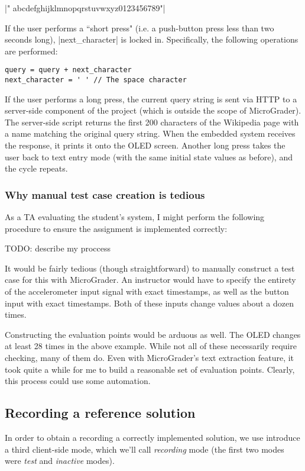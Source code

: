 \documentclass[12pt]{article}
\begin{document}
|" abcdefghijklmnopqrstuvwxyz0123456789"|

If the user performs a ``short press" (i.e. a push-button press less than two seconds long), |next_character| is locked in.  Specifically, the following operations are performed:

\begin{lstlisting}
query = query + next_character
next_character = ' ' // The space character
\end{lstlisting}


If the user performs a long press, the current query string is sent via HTTP to a server-side component of the project (which is outside the scope of MicroGrader).  The server-side script returns the first 200 characters of the Wikipedia page with a name matching the original query string.  When the embedded system receives the response, it prints it onto the OLED screen.  Another long press takes the user back to text entry mode (with the same initial state values as before), and the cycle repeats.

\subsubsection{Why manual test case creation is tedious}
As a TA evaluating the student's system, I might perform the following procedure to ensure the assignment is implemented correctly:

TODO: describe my proccess

It would be fairly tedious (though straightforward) to manually construct a test case for this with MicroGrader.  An instructor would have to specify the entirety of the accelerometer input signal with exact timestamps, as well as the button input with exact timestamps.  Both of these inputs change values about a dozen times.

Constructing the evaluation points would be arduous as well.  The OLED changes at least 28 times in the above example.  While not all of these necessarily require checking, many of them do.  Even with MicroGrader's text extraction feature, it took quite a while for me to build a reasonable set of evaluation points.   Clearly, this process could use some automation.

\subsection{Recording a reference solution}
In order to obtain a recording a correctly implemented solution, we use introduce a third client-side mode, which we'll call \textit{recording} mode (the first two modes were \textit{test} and \textit{inactive} modes). 
\end{document}
